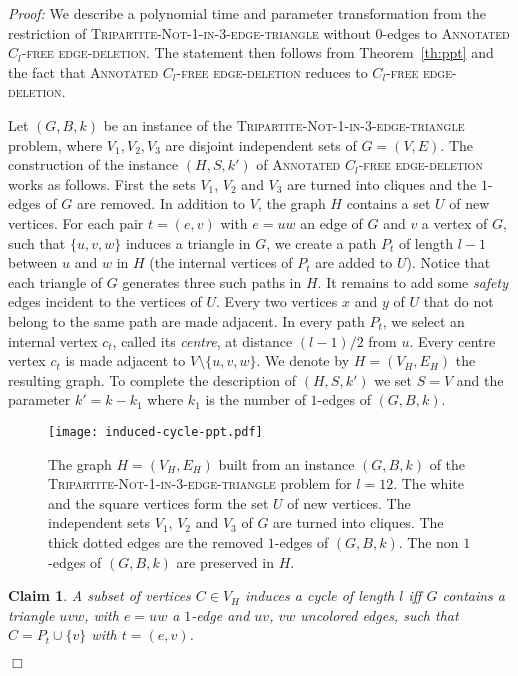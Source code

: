 \documentclass[11pt]{article}
\newenvironment{proof}{\noindent\textit{Proof: }}{{\hfill $\Box$}}
\newtheorem{claim}[lemma]{Claim}
\newcommand{\tgbc}{\textsc{Tripartite-Not-1-in-3-edge-triangle}}
\begin{document}
\begin{proof}
We describe a polynomial time and parameter transformation from the restriction of \tgbc{} without $0$-edges to \textsc{Annotated $C_l$-free edge-deletion}. The statement then follows from Theorem~\ref{th:ppt} and the fact that \textsc{Annotated $C_l$-free edge-deletion} reduces to \textsc{$C_l$-free edge-deletion}.

Let $(G,B,k)$ be an instance of the \tgbc{} problem, where $V_1,V_2,V_3$ are disjoint independent sets of $G=(V,E)$. The construction of the instance $(H,S,k')$ of \textsc{Annotated $C_l$-free edge-deletion} works as follows. First the sets $V_1$, $V_2$ and $V_3$ are turned into cliques and the $1$-edges of $G$ are removed. In addition to $V$, the graph $H$ contains a set $U$ of new vertices. For each pair $t=(e,v)$ with $e=uw$ an edge of $G$ and $v$ a vertex of $G$, such that $\{u,v,w\}$ induces a triangle in $G$, we create a path $P_t$ of length $l-1$ between $u$ and $w$ in $H$ (the internal vertices of $P_t$ are added to $U$). Notice that each triangle of $G$ generates three such paths in $H$. It remains to add some \emph{safety} edges incident to the vertices of $U$. Every two vertices $x$ and $y$ of $U$ that do not belong to the same path are made adjacent.
In every path $P_t$, we select an internal vertex $c_t$, called its \emph{centre}, at distance $(l-1)/2$ from $u$. Every centre vertex $c_t$ is made adjacent to $V\setminus\{u,v,w\}$. We denote by $H=(V_H,E_H)$ the resulting graph. To complete the description of $(H,S,k')$ we set $S=V$ and the parameter $k'=k-k_1$ where $k_1$ is the number of $1$-edges of $(G,B,k)$.

\begin{figure}[ht]
\centerline{\texttt{[image: induced-cycle-ppt.pdf]}}
\caption{The graph $H=(V_H,E_H)$ built from an instance $(G,B,k)$ of the \tgbc{} problem for $l=12$. The white and the square vertices form the set $U$ of new vertices. The independent sets $V_1$, $V_2$ and $V_3$ of $G$ are turned into cliques. The thick dotted edges are the removed $1$-edges of $(G,B,k)$. The non $1$-edges of $(G,B,k)$ are preserved in $H$. 
\label{fig:cycle}}
\end{figure}

\begin{claim}
\label{claim:nokernel-cl}
A subset of vertices $C\in V_H$ induces a cycle of length $l$ iff $G$ contains a triangle $uvw$,  
with $e=uw$ a $1$-edge and $uv$, $vw$ uncolored edges, such that $C=P_{t}\cup\{v\}$ with $t=(e,v)$.
\end{claim}


\end{proof}
\end{document}
